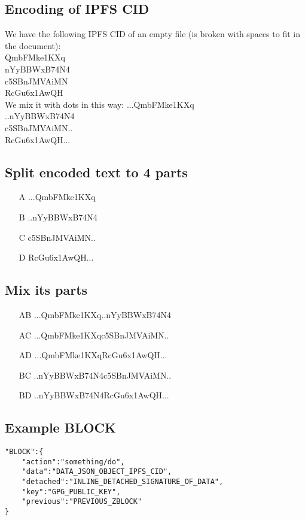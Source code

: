 \documentclass[10pt,a4paper,twocolumn]{paper}
\begin{document}
\subsection{Encoding of IPFS CID}\label{example-encoding}

We have the following IPFS CID of an empty file (is broken with spaces to fit in the document):\\
QmbFMke1KXq\\
nYyBBWxB74N4\\
c5SBnJMVAiMN\\
RcGu6x1AwQH\\

We mix it with dots in this way:
...QmbFMke1KXq\\
..nYyBBWxB74N4\\
c5SBnJMVAiMN..\\
RcGu6x1AwQH...\\

\subsection{Split encoded text to 4 parts}\label{example-split}

\begin{enumerate}
	\item[A] ...QmbFMke1KXq
	\item[B] ..nYyBBWxB74N4
	\item[C] c5SBnJMVAiMN..
	\item[D] RcGu6x1AwQH...
\end{enumerate}



\subsection{Mix its parts}\label{example-multiplex}
\begin{enumerate}
	\item[AB] ...QmbFMke1KXq..nYyBBWxB74N4
	\item[AC] ...QmbFMke1KXqc5SBnJMVAiMN.. 
	\item[AD] ...QmbFMke1KXqRcGu6x1AwQH...
	\item[BC] ..nYyBBWxB74N4c5SBnJMVAiMN..
	\item[BD] ..nYyBBWxB74N4RcGu6x1AwQH...
\end{enumerate}

\subsection{Example BLOCK}\label{example-block}
\begin{verbatim}
"BLOCK":{
    "action":"something/do",
    "data":"DATA_JSON_OBJECT_IPFS_CID",
    "detached":"INLINE_DETACHED_SIGNATURE_OF_DATA",
    "key":"GPG_PUBLIC_KEY",
    "previous":"PREVIOUS_ZBLOCK"
}
\end{verbatim}
\end{document}
